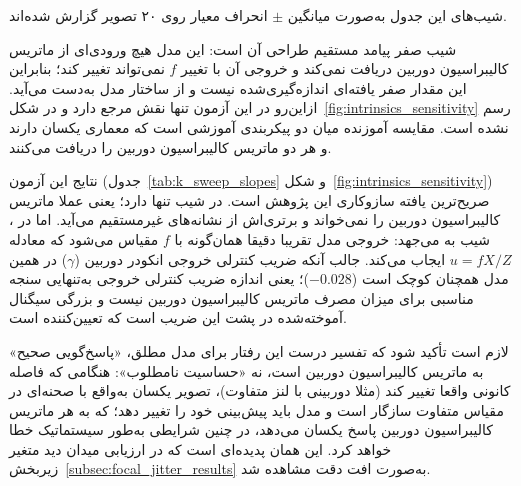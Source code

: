 شیب‌های این جدول به‌صورت میانگین $\pm$ انحراف معیار روی ۲۰ تصویر گزارش شده‌اند.

شیب صفر \controlmodel{} پیامد مستقیم طراحی آن است: این مدل هیچ ورودی‌ای از ماتریس کالیبراسیون دوربین دریافت نمی‌کند و خروجی آن با تغییر $f$ نمی‌تواند تغییر کند؛ بنابراین این مقدار صفر یافته‌ای اندازه‌گیری‌شده نیست و از ساختار مدل به‌دست می‌آید. ازاین‌رو \controlmodel{} در این آزمون تنها نقش مرجع دارد و در شکل~\ref{fig:intrinsics_sensitivity} رسم نشده است. مقایسه آموزنده میان دو پیکربندی آموزشی \proposedmodel{} است که معماری یکسان دارند و هر دو ماتریس کالیبراسیون دوربین را دریافت می‌کنند.

نتایج این آزمون (جدول~\ref{tab:k_sweep_slopes} و شکل~\ref{fig:intrinsics_sensitivity}) صریح‌ترین یافته سازوکاری این پژوهش است. \proposedmodel{} در \zoomcropconfig{} شیب تنها  دارد؛ یعنی عملا ماتریس کالیبراسیون دوربین را نمی‌خواند و برتری‌اش از نشانه‌های غیرمستقیم می‌آید. اما در \focaljitterconfig{}، شیب به  می‌جهد: خروجی مدل تقریبا دقیقا همان‌گونه با $f$ مقیاس می‌شود که معادله $u = f X / Z$ ایجاب می‌کند. جالب آنکه ضریب کنترلی خروجی انکودر دوربین ($\gamma$) در همین مدل همچنان کوچک است ($-0.028$)؛ یعنی اندازه ضریب کنترلی خروجی به‌تنهایی سنجه مناسبی برای میزان مصرف ماتریس کالیبراسیون دوربین نیست و بزرگی سیگنال آموخته‌شده در پشت این ضریب است که تعیین‌کننده است.

لازم است تأکید شود که تفسیر درست این رفتار برای مدل مطلق، «پاسخ‌گویی صحیح» به ماتریس کالیبراسیون دوربین است، نه «حساسیت نامطلوب»: هنگامی که فاصله کانونی واقعا تغییر کند (مثلا دوربینی با لنز متفاوت)، تصویر یکسان به‌واقع با صحنه‌ای در مقیاس متفاوت سازگار است و مدل باید پیش‌بینی خود را تغییر دهد؛ \controlmodel{} که به هر ماتریس کالیبراسیون دوربین پاسخ یکسان می‌دهد، در چنین شرایطی به‌طور سیستماتیک خطا خواهد کرد. این همان پدیده‌ای است که در ارزیابی میدان دید متغیر زیربخش~\ref{subsec:focal_jitter_results} به‌صورت افت دقت \controlmodel{} مشاهده شد.

